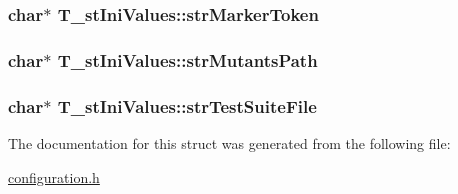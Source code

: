 \hypertarget{structT__stIniValues_ac65031fbdca94a97851ea1d067dc5f13}{
\subsubsection[{str\-Marker\-Token}]{\setlength{\rightskip}{0pt plus 5cm}char$\ast$ T\-\_\-st\-Ini\-Values\-::str\-Marker\-Token}}\label{structT__stIniValues_ac65031fbdca94a97851ea1d067dc5f13}
\hypertarget{structT__stIniValues_ac22b85753c96ab5c7e42e276efd510ee}{
\subsubsection[{str\-Mutants\-Path}]{\setlength{\rightskip}{0pt plus 5cm}char$\ast$ T\-\_\-st\-Ini\-Values\-::str\-Mutants\-Path}}\label{structT__stIniValues_ac22b85753c96ab5c7e42e276efd510ee}
\hypertarget{structT__stIniValues_a3effe0bd84fa5aeee8f4c3f692aa8bfd}{
\subsubsection[{str\-Test\-Suite\-File}]{\setlength{\rightskip}{0pt plus 5cm}char$\ast$ T\-\_\-st\-Ini\-Values\-::str\-Test\-Suite\-File}}\label{structT__stIniValues_a3effe0bd84fa5aeee8f4c3f692aa8bfd}


The documentation for this struct was generated from the following file\-:\begin{DoxyCompactItemize}
\item 
\hyperlink{configuration_8h}{configuration.\-h}\end{DoxyCompactItemize}
